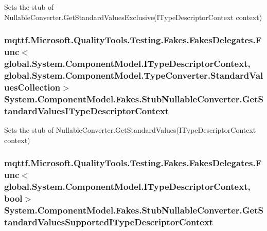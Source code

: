 Sets the stub of Nullable\-Converter.\-Get\-Standard\-Values\-Exclusive(\-I\-Type\-Descriptor\-Context context)

\hypertarget{class_system_1_1_component_model_1_1_fakes_1_1_stub_nullable_converter_a880f566ff8dafc6b0346b66579719865}{
\subsubsection[{Get\-Standard\-Values\-I\-Type\-Descriptor\-Context}]{\setlength{\rightskip}{0pt plus 5cm}mqttf.\-Microsoft.\-Quality\-Tools.\-Testing.\-Fakes.\-Fakes\-Delegates.\-Func$<$global.\-System.\-Component\-Model.\-I\-Type\-Descriptor\-Context, global.\-System.\-Component\-Model.\-Type\-Converter.\-Standard\-Values\-Collection$>$ System.\-Component\-Model.\-Fakes.\-Stub\-Nullable\-Converter.\-Get\-Standard\-Values\-I\-Type\-Descriptor\-Context}}\label{class_system_1_1_component_model_1_1_fakes_1_1_stub_nullable_converter_a880f566ff8dafc6b0346b66579719865}


Sets the stub of Nullable\-Converter.\-Get\-Standard\-Values(\-I\-Type\-Descriptor\-Context context)

\hypertarget{class_system_1_1_component_model_1_1_fakes_1_1_stub_nullable_converter_a758a4443f4f956b7ddebcd341d613e76}{
\subsubsection[{Get\-Standard\-Values\-Supported\-I\-Type\-Descriptor\-Context}]{\setlength{\rightskip}{0pt plus 5cm}mqttf.\-Microsoft.\-Quality\-Tools.\-Testing.\-Fakes.\-Fakes\-Delegates.\-Func$<$global.\-System.\-Component\-Model.\-I\-Type\-Descriptor\-Context, bool$>$ System.\-Component\-Model.\-Fakes.\-Stub\-Nullable\-Converter.\-Get\-Standard\-Values\-Supported\-I\-Type\-Descriptor\-Context}}\label{class_system_1_1_component_model_1_1_fakes_1_1_stub_nullable_converter_a758a4443f4f956b7ddebcd341d613e76}


